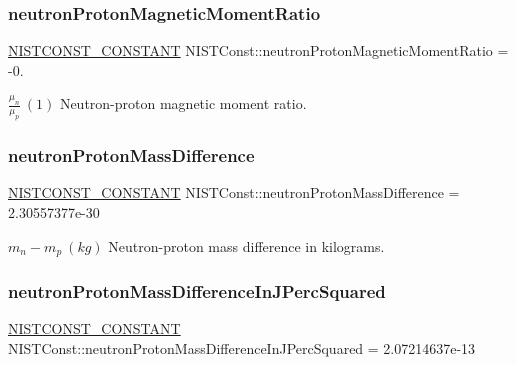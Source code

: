 \subsubsection{\texorpdfstring{neutron\+Proton\+Magnetic\+Moment\+Ratio}{neutronProtonMagneticMomentRatio}}
{\footnotesize\ttfamily \mbox{\hyperlink{_n_i_s_t_const_8hpp_a2b0fc1d7452373f816175dd86ce26729}{N\+I\+S\+T\+C\+O\+N\+S\+T\+\_\+\+C\+O\+N\+S\+T\+A\+NT}} N\+I\+S\+T\+Const\+::neutron\+Proton\+Magnetic\+Moment\+Ratio = -\/0.}

$\frac{\mu_n}{\mu_p} \ (1)$ Neutron-\/proton magnetic moment ratio. \mbox{\label{group___n_i_s_t_const-_neutron_gaeb775581e4a0461cfb4d2401b297e862}} 
\subsubsection{\texorpdfstring{neutron\+Proton\+Mass\+Difference}{neutronProtonMassDifference}}
{\footnotesize\ttfamily \mbox{\hyperlink{_n_i_s_t_const_8hpp_a2b0fc1d7452373f816175dd86ce26729}{N\+I\+S\+T\+C\+O\+N\+S\+T\+\_\+\+C\+O\+N\+S\+T\+A\+NT}} N\+I\+S\+T\+Const\+::neutron\+Proton\+Mass\+Difference = 2.\+30557377e-\/30}

$m_n - m_p \ (kg)$ Neutron-\/proton mass difference in kilograms. \mbox{\label{group___n_i_s_t_const-_neutron_gad9c0887872f150ac292cd709ed16f61e}} 
\subsubsection{\texorpdfstring{neutron\+Proton\+Mass\+Difference\+In\+J\+Perc\+Squared}{neutronProtonMassDifferenceInJPercSquared}}
{\footnotesize\ttfamily \mbox{\hyperlink{_n_i_s_t_const_8hpp_a2b0fc1d7452373f816175dd86ce26729}{N\+I\+S\+T\+C\+O\+N\+S\+T\+\_\+\+C\+O\+N\+S\+T\+A\+NT}} N\+I\+S\+T\+Const\+::neutron\+Proton\+Mass\+Difference\+In\+J\+Perc\+Squared = 2.\+07214637e-\/13}

